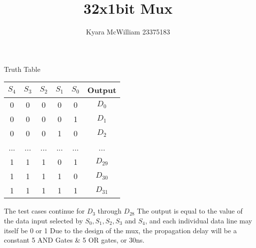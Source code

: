 \documentclass{article}
\title{32x1bit Mux}
\author{Kyara McWilliam 23375183}
\date{}
\begin{document}
\maketitle

Truth Table

\begin{tabular}{ |c|c|c|c|c|c| }
\hline
$S_4$ & $S_3$ & $S_2$ & $S_1$ & $S_0$ & Output \\
\hline
0 & 0 & 0 & 0 & 0 & $D_0$ \\
0 & 0 & 0 & 0 & 1 & $D_1$ \\
0 & 0 & 0 & 1 & 0 & $D_2$ \\
... & ... & ... & ... & ... & ... \\
1 & 1 & 1 & 0 & 1 & $D_{29}$ \\
1 & 1 & 1 & 1 & 0 & $D_{30}$ \\
1 & 1 & 1 & 1 & 1 & $D_{31}$ \\
\hline
\end{tabular}
\hfill \break

The test cases continue for $D_3$ through $D_{28}$ \newline
The output is equal to the value of the data input selected by $S_0, S_1, S_2, S_3$ and $S_4$, and each individual data line may itself be 0 or 1 \newline
Due to the design of the mux, the propagation delay will be a constant 5 AND Gates \& 5 OR gates, or 30ns.
\end{document}
